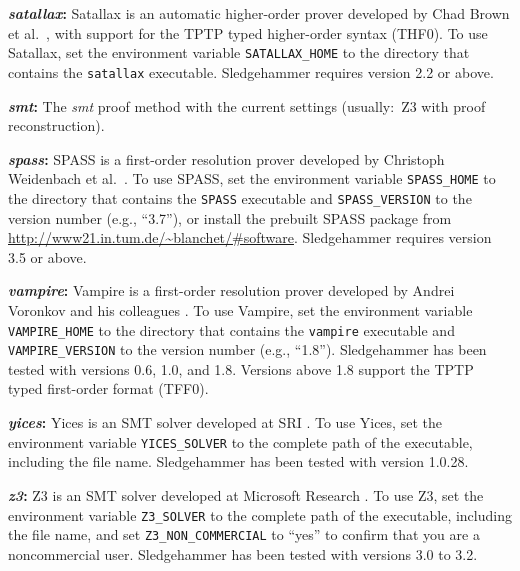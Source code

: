 \documentclass[a4paper,12pt]{article}
\newcommand\download{\url{http://www21.in.tum.de/~blanchet/\#software}}
\begin{document}
\begin{enum}
\begin{enum}
\item[\labelitemi] \textbf{\textit{satallax}:} Satallax is an automatic
higher-order prover developed by Chad Brown et al.\ \cite{satallax}, with
support for the TPTP typed higher-order syntax (THF0). To use Satallax, set the
environment variable \texttt{SATALLAX\_HOME} to the directory that contains the
\texttt{satallax} executable. Sledgehammer requires version 2.2 or above.

\item[\labelitemi] \textbf{\textit{smt}:} The \textit{smt} proof method with the
current settings (usually:\ Z3 with proof reconstruction).

\item[\labelitemi] \textbf{\textit{spass}:} SPASS is a first-order resolution
prover developed by Christoph Weidenbach et al.\ \cite{weidenbach-et-al-2009}.
To use SPASS, set the environment variable \texttt{SPASS\_HOME} to the directory
that contains the \texttt{SPASS} executable and \texttt{SPASS\_VERSION} to the
version number (e.g., ``3.7''), or install the prebuilt SPASS package from
\download. Sledgehammer requires version 3.5 or above.

\item[\labelitemi] \textbf{\textit{vampire}:} Vampire is a first-order resolution
prover developed by Andrei Voronkov and his colleagues
\cite{riazanov-voronkov-2002}. To use Vampire, set the environment variable
\texttt{VAMPIRE\_HOME} to the directory that contains the \texttt{vampire}
executable and \texttt{VAMPIRE\_VERSION} to the version number (e.g., ``1.8'').
Sledgehammer has been tested with versions 0.6, 1.0, and 1.8.
Versions above 1.8 support the TPTP typed first-order format (TFF0).

\item[\labelitemi] \textbf{\textit{yices}:} Yices is an SMT solver developed at
SRI \cite{yices}. To use Yices, set the environment variable
\texttt{YICES\_SOLVER} to the complete path of the executable, including the
file name. Sledgehammer has been tested with version 1.0.28.

\item[\labelitemi] \textbf{\textit{z3}:} Z3 is an SMT solver developed at
Microsoft Research \cite{z3}. To use Z3, set the environment variable
\texttt{Z3\_SOLVER} to the complete path of the executable, including the file
name, and set \texttt{Z3\_NON\_COMMERCIAL} to ``yes'' to confirm that you are a
noncommercial user. Sledgehammer has been tested with versions 3.0 to 3.2.


\end{enum}
\end{enum}
\end{document}
